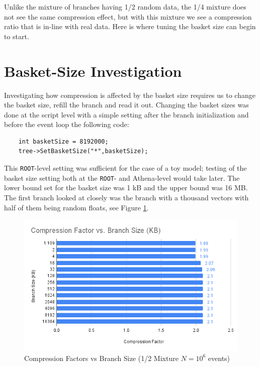 Unlike the mixture of branches having 1/2 random data, the 1/4 mixture does not see the same compression effect, but with this mixture we see a compression ratio that is in-line with real data.
Here is where tuning the basket size can begin to start.

\section{Basket-Size Investigation}
\label{sec: toy-model basket-size investigation}

Investigating how compression is affected by the basket size requires us to change the basket size, refill the branch and read it out.
Changing the basket sizes was done at the script level with a simple setting after the branch initialization and before the event loop the following code:
\begin{lstlisting}
    int basketSize = 8192000;
    tree->SetBasketSize("*",basketSize);
\end{lstlisting}
This \verb|ROOT|-level setting was sufficient for the case of a toy model; testing of the basket size setting both at the \verb|ROOT|- and Athena-level would take later.
The lower bound set for the basket size was 1 kB and the upper bound was 16 MB.
The first branch looked at closely was the branch with a thousand vectors with half of them being random floats, see Figure \ref{fig:toymodel_CFvsBranchSize_1/2mixture}.

\begin{figure}[h]
    \centering
    \includegraphics[width=.8\textwidth]{content/toymodel_content/Compression Factor vs. Branch Size (KB).png}
    \caption{Compression Factors vs Branch Size (1/2 Mixture $N=10^6$ events)}
    \label{fig:toymodel_CFvsBranchSize_1/2mixture}
\end{figure}

